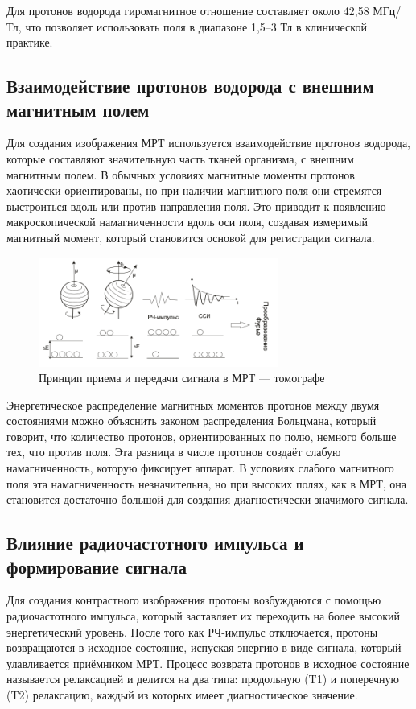 Для протонов водорода гиромагнитное отношение составляет около 42,58 МГц/Тл, что позволяет использовать поля в диапазоне 1,5–3 Тл в клинической практике\cite{ktmrt}.

\subsection{Взаимодействие протонов водорода с внешним магнитным полем}

Для создания изображения МРТ используется взаимодействие протонов водорода, которые составляют значительную часть тканей организма, с внешним магнитным полем. В обычных условиях магнитные моменты протонов хаотически ориентированы, но при наличии магнитного поля они стремятся выстроиться вдоль или против направления поля. Это приводит к появлению макроскопической намагниченности вдоль оси поля, создавая измеримый магнитный момент, который становится основой для регистрации сигнала\cite{ktmrt}.
\begin{figure}[H]
    \centering
    \includegraphics[width=0.7\textwidth]{pic/7.png}
    \caption{Принцип приема и передачи сигнала в МРТ — томографе}
    \label{fig:image1}
\end{figure}
Энергетическое распределение магнитных моментов протонов между двумя состояниями можно объяснить законом распределения Больцмана, который говорит, что количество протонов, ориентированных по полю, немного больше тех, что против поля. Эта разница в числе протонов создаёт слабую намагниченность, которую фиксирует аппарат. В условиях слабого магнитного поля эта намагниченность незначительна, но при высоких полях, как в МРТ, она становится достаточно большой для создания диагностически значимого сигнала\cite{ktmrt}.

\subsection{Влияние радиочастотного импульса и формирование сигнала}

Для создания контрастного изображения протоны возбуждаются с помощью радиочастотного импульса, который заставляет их переходить на более высокий энергетический уровень. После того как РЧ-импульс отключается, протоны возвращаются в исходное состояние, испуская энергию в виде сигнала, который улавливается приёмником МРТ. Процесс возврата протонов в исходное состояние называется релаксацией и делится на два типа: продольную (T1) и поперечную (T2) релаксацию, каждый из которых имеет диагностическое значение\cite{ktmrt}.

